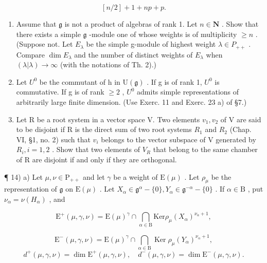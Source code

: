 \[
[ n / 2 ] + 1 + n p + p.
\]

\begin{enumerate}
\def\labelenumi{\arabic{enumi})}
\setcounter{enumi}{10}
\item
  Assume that \(\mathfrak{g}\) is not a product of algebras of rank 1. Let \(n\in \mathbf{N}\) . Show that there exists a simple \(\mathfrak{g}\) -module one of whose weights is of multiplicity \(\geq n\) . (Suppose not. Let \(E_{\lambda}\) be the simple g-module of highest weight \(\lambda \in P_{++}\) . Compare \(\dim E_{\lambda}\) and the number of distinct weights of \(E_{\lambda}\) when \((\lambda|\lambda) \to \infty\) (with the notations of Th. 2).)
\item
  Let \(U^{0}\) be the commutant of h in \(\mathrm{U}(\mathfrak{g})\) . If g is of rank 1, \(U^{0}\) is commutative. If g is of rank \(\geq 2\) , \(U^{0}\) admits simple representations of arbitrarily large finite dimension. (Use Exerc. 11 and Exerc. 23 a) of §7.)
\item
  Let R be a root system in a vector space V. Two elements \(v_{1}, v_{2}\) of V are said to be disjoint if R is the direct sum of two root systems \(R_{1}\) and \(R_{2}\) (Chap. VI, §1, no. 2) such that \(v_{i}\) belongs to the vector subspace of V generated by \(R_{i}, i = 1, 2\) . Show that two elements of \(V_{R}\) that belong to the same chamber of R are disjoint if and only if they are orthogonal.
\end{enumerate}

¶ 14) a) Let \(\mu, \nu \in \mathrm{P}_{++}\) and let \(\gamma\) be a weight of \(\mathrm{E}(\mu)\) . Let \(\rho_{\mu}\) be the representation of \(\mathfrak{g}\) on \(\mathrm{E}(\mu)\) . Let \(X_{\alpha} \in \mathfrak{g}^{\alpha} - \{0\}, Y_{\alpha} \in \mathfrak{g}^{-\alpha} - \{0\}\) . If \(\alpha \in \mathrm{B}\) , put \(\nu_{\alpha} = \nu(H_{\alpha})\) , and

\[
\mathrm{E} ^ {+} (\mu , \gamma , \nu) = \mathrm{E} (\mu) ^ {\gamma} \cap \bigcap_ {\alpha \in \mathrm{B}} \mathrm{Ker} \rho_ {\mu} (X _ {\alpha}) ^ {\nu_ {\alpha} + 1},
\]

\[
\mathrm{E} ^ {-} (\mu , \gamma , \nu) = \mathrm{E} (\mu) ^ {\gamma} \cap \bigcap_ {\alpha \in \mathrm{B}} \operatorname{Ker} \rho_ {\mu} (Y _ {\alpha}) ^ {\nu_ {\alpha} + 1},
\]
\relax{}
\[
d ^ {+} (\mu , \gamma , \nu) = \dim \mathrm{E} ^ {+} (\mu , \gamma , \nu), \quad d ^ {-} (\mu , \gamma , \nu) = \dim \mathrm{E} ^ {-} (\mu , \gamma , \nu).
\]


